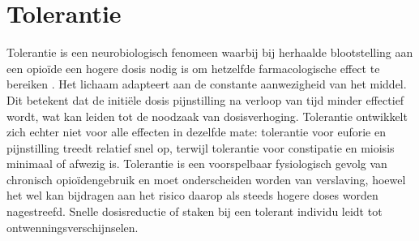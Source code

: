 \documentclass[11pt, a4paper]{report} %
\begin{document}
\section{Tolerantie}
Tolerantie is een neurobiologisch fenomeen waarbij bij herhaalde blootstelling aan een opioïde een hogere dosis nodig is om hetzelfde farmacologische effect te bereiken \parencite{PMC2010NeurobiologyDependence}. Het lichaam adapteert aan de constante aanwezigheid van het middel. Dit betekent dat de initiële dosis pijnstilling na verloop van tijd minder effectief wordt, wat kan leiden tot de noodzaak van dosisverhoging. Tolerantie ontwikkelt zich echter niet voor alle effecten in dezelfde mate: tolerantie voor euforie en pijnstilling treedt relatief snel op, terwijl tolerantie voor constipatie en mioisis minimaal of afwezig is. Tolerantie is een voorspelbaar fysiologisch gevolg van chronisch opioïdengebruik en moet onderscheiden worden van verslaving, hoewel het wel kan bijdragen aan het risico daarop als steeds hogere doses worden nagestreefd. Snelle dosisreductie of staken bij een tolerant individu leidt tot ontwenningsverschijnselen.
\end{document}
